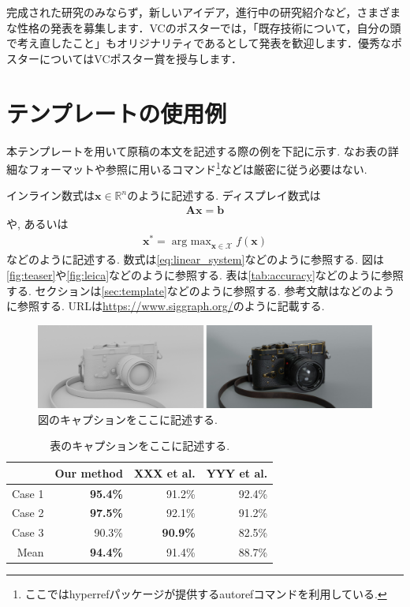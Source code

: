 \documentclass{vc}
\begin{document}
完成された研究のみならず，新しいアイデア，進行中の研究紹介など，さまざまな性格の発表を募集します．VCのポスターでは，「既存技術について，自分の頭で考え直したこと」もオリジナリティであるとして発表を歓迎します．優秀なポスターについてはVCポスター賞を授与します．

\section{テンプレートの使用例}
\label{sec:template}

本テンプレートを用いて原稿の本文を記述する際の例を下記に示す.
なお表の詳細なフォーマットや参照に用いるコマンド\footnote{ここでは\textsf{hyperref}パッケージが提供する\textsf{autoref}コマンド\cite{Wikibooks:LaTeX:Ref}を利用している.}などは厳密に従う必要はない.

インライン数式は$\mathbf{x} \in \mathbb{R}^{n}$のように記述する.
ディスプレイ数式は
\begin{align}
  \mathbf{A} \mathbf{x} = \mathbf{b}
  \label{eq:linear_system}
\end{align}
や, あるいは
\begin{align}
  \mathbf{x}^{*} = \mathop{\text{arg max}}_{\mathbf{x} \in \mathcal{X}} f(\mathbf{x})
\end{align}
などのように記述する.
数式は\autoref{eq:linear_system}などのように参照する.
図は\autoref{fig:teaser}や\autoref{fig:leica}などのように参照する.
表は\autoref{tab:accuracy}などのように参照する.
セクションは\autoref{sec:template}などのように参照する.
参考文献は\cite{GSC12,WL00}などのように参照する.
URLは\url{https://www.siggraph.org/}のように記載する.

\begin{figure}
  \centering
  \includegraphics[width=\columnwidth]{./figures/leica.pdf}
  \caption{図のキャプションをここに記述する.}
  \label{fig:leica}
\end{figure}

\begin{table}
  \centering
  \caption{表のキャプションをここに記述する.}
  \label{tab:accuracy}
  \begin{tabular}{@{}rrrr@{}}
    \toprule
    & Our method & XXX et al. & YYY et al. \\
    \midrule
    Case 1 & \textbf{95.4\%} &         91.2\%  & 92.4\% \\
    Case 2 & \textbf{97.5\%} &         92.1\%  & 91.2\% \\
    Case 3 &         90.3\%  & \textbf{90.9\%} & 82.5\% \\
    \midrule
    Mean   & \textbf{94.4\%} &         91.4\%  & 88.7\% \\
    \bottomrule
  \end{tabular}
\end{table}
\end{document}
